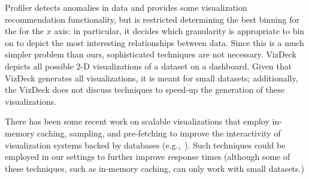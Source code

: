 Profiler 
detects anomalies in data \cite{DBLP:conf/avi/KandelPPHH12} and provides
some visualization recommendation functionality,
but is restricted determining the best binning for the
for the $x$ axis: in particular, it decides which granularity
is appropriate to bin on to depict the most interesting relationships 
between data. 
Since this is a much simpler problem
than ours, sophisticated techniques are not necessary.
VizDeck~\cite{DBLP:conf/sigmod/KeyHPA12}
depicts all possible 2-D visualizations of a dataset on a dashboard.
Given that VizDeck generates all visualizations, it is  meant for 
small datasets; additionally, the VizDeck does not discuss techniques
to speed-up the generation of these visualizations. 


  There has been some recent work on
scalable visualizations that employ in-memory caching, sampling, and
pre-fetching to improve the interactivity of visualization systems
backed by
databases (e.g.,~\cite{doshi2003prefetching,DBLP:journals/corr/KimBPIMR14}).
Such techniques could be employed in our settings to further improve
response times (although some of these techniques, such as in-memory caching,
can only work with small datasets.)



